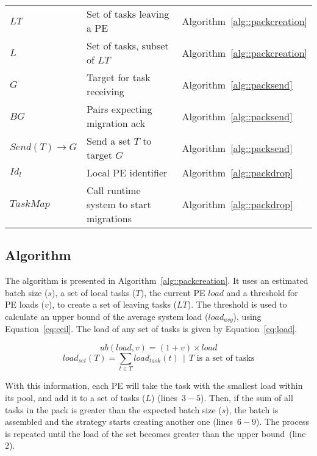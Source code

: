\begin{table}[t]
{\begin{tabular}{l l l}
		$LT$				& Set of tasks leaving a PE 							& Algorithm~\ref{alg::packcreation} \\
		$L$				& Set of tasks, subset of $LT$						& Algorithm~\ref{alg::packcreation} \\
		$G$				& Target for task receiving							& Algorithm~\ref{alg::packsend} \\
		$BG$				& Pairs expecting migration ack						& Algorithm~\ref{alg::packsend} \\ 
		$Send(T)\rightarrow G $ & Send a set $T$ to target $G$				& Algorithm~\ref{alg::packsend} \\ 
		$Id_l$ 			& Local PE identifier								& Algorithm~\ref{alg::packdrop} \\
		$TaskMap$		& Call runtime system to start migrations					& Algorithm~\ref{alg::packdrop} \\
		\bottomrule
	\end{tabular}
	}
	\label{tab:algo:symbols}
	\vspace{-10pt}
\end{table}

\subsection{\batchassembly Algorithm} \label{sec:algo:creation}

The \batchassembly algorithm is presented in Algorithm~\ref{alg::packcreation}.
It uses an estimated batch size ($s$), a set of local tasks ($T$), the current PE $load$ and a threshold for PE loads ($v$), to create a set of leaving tasks ($LT$).
The threshold is used to calculate an upper bound of the average system load ($load_{avg}$), using Equation~\ref{eq:ceil}. 
The load of any set of tasks is given by Equation~\ref{eq:load}.

\begin{equation}
	ub(load,v) = (1+v)\times load
    \label{eq:ceil}
\end{equation}
\begin{equation}
	load_{set}(T) = \sum_{t \in T}{load_{task}(t)}\ \ |\ \ T \text{ is a set of tasks}
	\label{eq:load}
\end{equation}

With this information, each PE will take the task with the smallest load within its pool, and add it to a set of tasks ($L$) (lines~$3-5$).
Then, if the sum of all tasks in the pack is greater than the expected batch size ($s$), the batch is assembled and the strategy starts creating another one (lines~$6-9$).
The process is repeated until the load of the set becomes greater than the upper bound~(line~$2$).

